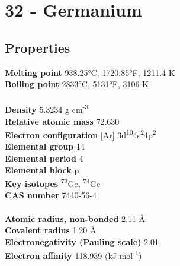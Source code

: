 \section{32 - Germanium}
\label{sec:elem-germanium}
\subsection{Properties}
\textbf{Melting point} 938.25°C, 1720.85°F, 1211.4 K\\
\textbf{Boiling point} 2833°C, 5131°F, 3106 K\\
\\
\textbf{Density} 5.3234 g cm\textsuperscript{-3}\\
\textbf{Relative atomic mass} 72.630\\
\textbf{Electron configuration} [Ar] 3d\textsuperscript{10}4s\textsuperscript{2}4p\textsuperscript{2} \\
\textbf{Elemental group} 14\\
\textbf{Elemental period} 4\\
\textbf{Elemental block} p\\
\textbf{Key isotopes} \textsuperscript{73}Ge, \textsuperscript{74}Ge\\
\textbf{CAS number} 7440-56-4\\
\\
\textbf{Atomic radius, non-bonded} 2.11 Å\\
\textbf{Covalent radius} 1.20 Å\\
\textbf{Electronegativity (Pauling scale)} 2.01\\
\textbf{Electron affinity} 118.939 (kJ mol\textsuperscript{-1})\\